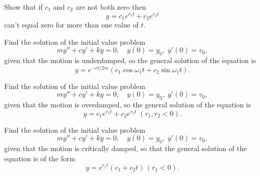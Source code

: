 \documentclass{ximera}
\begin{document}
\begin{problem}\label{exer:6.2.23}
Show that if $c_1$ and $c_2$ are not both zero then
$$
y=c_1e^{r_1t}+c_2e^{r_2t}
$$
 can't equal zero for more than one
value of $t$.
\end{problem}

\begin{problem}\label{exer:6.2.24}
Find the solution of the initial value problem
$$
my''+cy'+ky=0,\quad y(0)=y_0,\;y'(0)=v_0,
$$
given that the motion is underdamped, so  the general solution of
the equation is
$$
y=e^{-ct/2m}(c_1\cos\omega_1t+c_2\sin\omega_1t).
$$
\end{problem}

\begin{problem}\label{exer:6.2.25}
Find the solution of the initial value problem
$$
my''+cy'+ky=0,\quad y(0)=y_0,\;y'(0)=v_0,
$$
given that the motion is overdamped, so  the general solution of
the equation is
$$
y=c_1e^{r_1t}+c_2e^{r_2t}\;(r_1,r_2<0).
$$
\end{problem}

\begin{problem}\label{exer:6.2.26}
Find the solution of the initial value problem
$$
my''+cy'+ky=0,\quad y(0)=y_0,\;y'(0)=v_0,
$$
given that the motion is critically damped, so that the general
solution of the equation is of the form
$$
y=e^{r_1t}(c_1+c_2t)\,(r_1<0).
$$
\end{problem}
\end{document}
